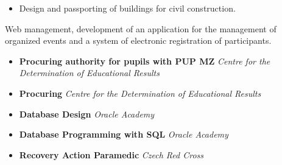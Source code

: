 \documentclass[10pt,a4paper,ragged2e]{altacv}
\begin{document}
\divider

\begin{itemize}
\item Design and passporting of buildings for civil construction.
\end{itemize}

\divider

\begin{itemize}
Web management, development of an application for the management of organized events and a system of electronic registration of participants.
\end{itemize}


\smallskip
\begin{itemize}
\smallskip
\item \textbf{Procuring authority for pupils with PUP MZ} \textit{Centre for the Determination of Educational Results}
\smallskip
\item \textbf{Procuring} \textit{Centre for the Determination of Educational Results}
\smallskip
\item \textbf{Database Design} \textit{Oracle Academy}
\smallskip
\item \textbf{Database Programming with SQL} \textit{Oracle Academy}
\smallskip
\item \textbf{Recovery Action Paramedic} \textit{Czech Red Cross}
\end{itemize}




\clearpage


\nocite{*}






\end{document}
